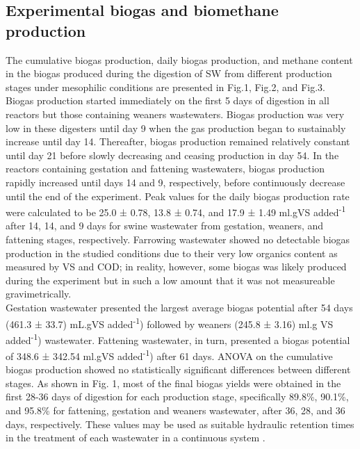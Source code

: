 \subsection{Experimental biogas and biomethane production}
The cumulative biogas production, daily biogas production, and methane content in the biogas produced during the digestion of SW from different production stages under mesophilic conditions are presented in Fig.1, Fig.2, and Fig.3.\\

Biogas production started immediately on the first 5 days of digestion in all reactors but those containing weaners wastewaters. Biogas production was very low in these digesters until day 9 when the gas production began to sustainably increase until day 14. Thereafter, biogas production remained relatively constant until day 21 before slowly decreasing and ceasing production in day 54. In the reactors containing gestation and fattening wastewaters, biogas production rapidly increased until days 14 and 9, respectively, before continuously decrease until the end of the experiment. Peak values for the daily biogas production rate were calculated to be 25.0 ± 0.78, 13.8 ± 0.74, and 17.9 ± 1.49 ml.gVS added\textsuperscript{-1} after 14, 14, and 9 days for swine wastewater from gestation, weaners, and fattening stages, respectively.
Farrowing wastewater showed no detectable biogas production in the studied conditions due to their very low organics content as measured by VS and COD; in reality, however, some biogas was likely produced during the experiment but in such a low amount that it was not measureable gravimetrically.\\
Gestation wastewater presented the largest average biogas potential after 54 days (461.3 ± 33.7) mL.gVS added\textsuperscript{-1}) followed by weaners (245.8 ± 3.16) ml.g VS added\textsuperscript{-1}) wastewater. Fattening wastewater, in turn, presented a biogas potential of 348.6 ± 342.54 ml.gVS added\textsuperscript{-1}) after 61 days.  ANOVA on the cumulative biogas production showed no statistically significant differences between different stages. As shown in Fig. 1, most of the final biogas yields were obtained in the first 28-36 days of digestion for each production stage, specifically 89.8\%, 90.1\%, and 95.8\% for fattening, gestation and weaners wastewater, after 36, 28, and 36 days, respectively. These values may be used as suitable hydraulic retention times in the treatment of each wastewater in a continuous system \cite{Li_2013}.

